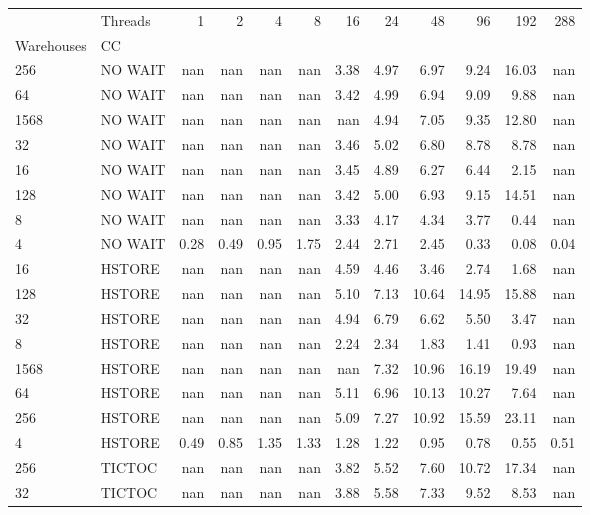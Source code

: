 \begin{tabular}{llrrrrrrrrrr}
\toprule
     & Threads &  1   &  2   &  4   &  8   &  16  &  24  &   48  &   96  &   192 &  288 \\
Warehouses & CC &      &      &      &      &      &      &       &       &       &      \\
\midrule
256  & NO WAIT &  nan &  nan &  nan &  nan & 3.38 & 4.97 &  6.97 &  9.24 & 16.03 &  nan \\
64   & NO WAIT &  nan &  nan &  nan &  nan & 3.42 & 4.99 &  6.94 &  9.09 &  9.88 &  nan \\
1568 & NO WAIT &  nan &  nan &  nan &  nan &  nan & 4.94 &  7.05 &  9.35 & 12.80 &  nan \\
32   & NO WAIT &  nan &  nan &  nan &  nan & 3.46 & 5.02 &  6.80 &  8.78 &  8.78 &  nan \\
16   & NO WAIT &  nan &  nan &  nan &  nan & 3.45 & 4.89 &  6.27 &  6.44 &  2.15 &  nan \\
128  & NO WAIT &  nan &  nan &  nan &  nan & 3.42 & 5.00 &  6.93 &  9.15 & 14.51 &  nan \\
8    & NO WAIT &  nan &  nan &  nan &  nan & 3.33 & 4.17 &  4.34 &  3.77 &  0.44 &  nan \\
4    & NO WAIT & 0.28 & 0.49 & 0.95 & 1.75 & 2.44 & 2.71 &  2.45 &  0.33 &  0.08 & 0.04 \\
16   & HSTORE &  nan &  nan &  nan &  nan & 4.59 & 4.46 &  3.46 &  2.74 &  1.68 &  nan \\
128  & HSTORE &  nan &  nan &  nan &  nan & 5.10 & 7.13 & 10.64 & 14.95 & 15.88 &  nan \\
32   & HSTORE &  nan &  nan &  nan &  nan & 4.94 & 6.79 &  6.62 &  5.50 &  3.47 &  nan \\
8    & HSTORE &  nan &  nan &  nan &  nan & 2.24 & 2.34 &  1.83 &  1.41 &  0.93 &  nan \\
1568 & HSTORE &  nan &  nan &  nan &  nan &  nan & 7.32 & 10.96 & 16.19 & 19.49 &  nan \\
64   & HSTORE &  nan &  nan &  nan &  nan & 5.11 & 6.96 & 10.13 & 10.27 &  7.64 &  nan \\
256  & HSTORE &  nan &  nan &  nan &  nan & 5.09 & 7.27 & 10.92 & 15.59 & 23.11 &  nan \\
4    & HSTORE & 0.49 & 0.85 & 1.35 & 1.33 & 1.28 & 1.22 &  0.95 &  0.78 &  0.55 & 0.51 \\
256  & TICTOC &  nan &  nan &  nan &  nan & 3.82 & 5.52 &  7.60 & 10.72 & 17.34 &  nan \\
32   & TICTOC &  nan &  nan &  nan &  nan & 3.88 & 5.58 &  7.33 &  9.52 &  8.53 &  nan \\

\end{tabular}
